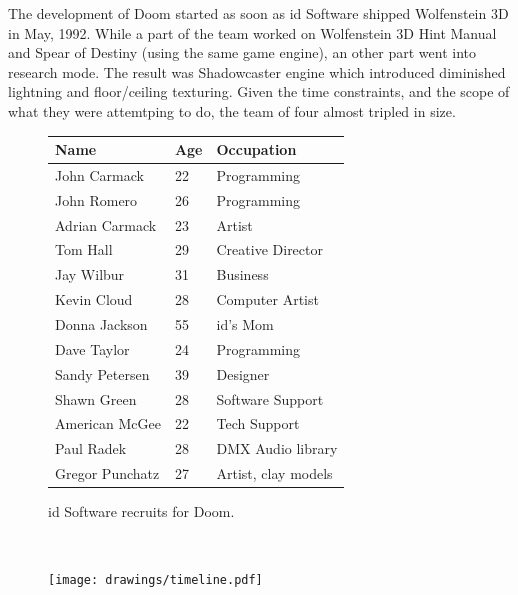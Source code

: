 The development of Doom started as soon as id Software shipped Wolfenstein 3D in May, 1992. While a part of the team worked on Wolfenstein 3D Hint Manual and Spear of Destiny (using the same game engine), an other part went into research mode. The result was Shadowcaster engine which introduced diminished lightning and floor/ceiling texturing. Given the time constraints, and the scope of what they were attemtping to do, the team of four almost tripled in size.\\
\par
 \begin{figure}[H]
\centering  
\begin{tabularx}{\textwidth}{ X  X  X  }
  \toprule
  \textbf{Name} &  \textbf{Age} & \textbf{Occupation} \\
  \toprule 
   John Carmack & 22 &  Programming\\
   John Romero & 26 &  Programming\\
   Adrian Carmack & 23 &  Artist\\
   Tom Hall\protect\footnotemark  & 29 &  Creative Director\\
   Jay Wilbur & 31 &  Business\\
   Kevin Cloud& 28 &  Computer Artist\\
   Donna Jackson & 55 & id's Mom\\   
   Dave Taylor & 24 & Programming\\
   Sandy Petersen & 39 & Designer\\
   Shawn Green & 28 & Software Support\\
   American McGee & 22 & Tech Support\\
   Paul Radek & 28 & DMX Audio library\\
   Gregor Punchatz & 27 & Artist, clay models\\

     \toprule
\end{tabularx}
\caption{id Software recruits for Doom.}\label{fig:Id Software team}
\end{figure}
\\


\par
\begin{figure}[H]
\centering
\texttt{[image: drawings/timeline.pdf]}
\end{figure}
\par





